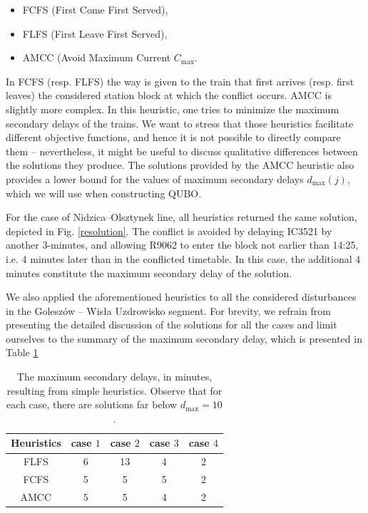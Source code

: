 \begin{itemize}
  \item FCFS (First Come First Served),
  \item FLFS (First Leave First Served),
  \item AMCC (Avoid Maximum Current $C_{\max}$.
\end{itemize}

In FCFS (resp. FLFS) the way is given to the train that first arrives (resp.
first leaves) the considered station block at which the conflict occurs. AMCC
is slightly more complex. In this heuristic, one tries to minimize the maximum
secondary delays of the trains. We want to stress that those heuristics
facilitate different objective functions, and hence it is not possible to
directly compare them -- nevertheless, it might be useful to discuss
qualitative differences between the solutions they produce. The solutions
provided by the AMCC heuristic also provides a lower bound for the values
of maximum secondary delays $d_{\max}(j)$, which we will use when constructing
QUBO.

For the case of Nidzica--Olsztynek line, all heuristics returned the same
solution, depicted in Fig. \ref{resolution}. The conflict is
avoided by delaying IC3521 by another 3-minutes, and allowing R9062 to enter
the block not earlier than 14:25, i.e. 4 minutes later than in the conflicted
timetable. In this case, the additional 4 minutes constitute the maximum
secondary delay of the solution.

We also applied the aforementioned heuristics to all the considered
disturbances in the Goleszów -- Wisła Uzdrowisko segment. For brevity, we
refrain from presenting the detailed discussion of the solutions for all the
cases and limit ourselves to the summary of the maximum secondary delay, which
is presented in Table \ref{tab:simple}

\begin{table}[bh]
  \centering
  \begin{tabular}{ccccc}
    Heuristics & case $1$ & case $2$ & case $3$ & case $4$ \\
    \hline
    FLFS       & 6        & 13       & 4        & 2        \\
    \hline
    FCFS       & 5        & 5        & 5        & 2        \\
    \hline
    AMCC       & 5        & 5        & 4        & 2        \\
    \hline
  \end{tabular}
  \caption{The maximum secondary delays, in minutes, resulting from simple heuristics.
    Observe that for each case, there are solutions far below $d_{\text{max}} =
      10$.} \label{tab:simple}
\end{table}

